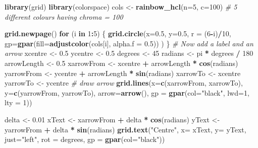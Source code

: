 \documentclass[9pt,letter]{article}
\newenvironment{Shaded}{\begin{snugshade}}{\end{snugshade}}
\newcommand{\KeywordTok}[1]{\textcolor[rgb]{0.13,0.29,0.53}{\textbf{#1}}}
\newcommand{\DataTypeTok}[1]{\textcolor[rgb]{0.13,0.29,0.53}{#1}}
\newcommand{\DecValTok}[1]{\textcolor[rgb]{0.00,0.00,0.81}{#1}}
\newcommand{\FloatTok}[1]{\textcolor[rgb]{0.00,0.00,0.81}{#1}}
\newcommand{\StringTok}[1]{\textcolor[rgb]{0.31,0.60,0.02}{#1}}
\newcommand{\CommentTok}[1]{\textcolor[rgb]{0.56,0.35,0.01}{\textit{#1}}}
\newcommand{\ControlFlowTok}[1]{\textcolor[rgb]{0.13,0.29,0.53}{\textbf{#1}}}
\newcommand{\OperatorTok}[1]{\textcolor[rgb]{0.81,0.36,0.00}{\textbf{#1}}}
\newcommand{\NormalTok}[1]{#1}
\begin{document}
\begin{Shaded}
\begin{Highlighting}[]
\KeywordTok{library}\NormalTok{(grid)}
\KeywordTok{library}\NormalTok{(colorspace)}
\NormalTok{cols <-}\StringTok{ }\KeywordTok{rainbow_hcl}\NormalTok{(}\DataTypeTok{n=}\DecValTok{5}\NormalTok{, }\DataTypeTok{c=}\DecValTok{100}\NormalTok{)  }\CommentTok{# 5 different colours having chroma = 100}

\KeywordTok{grid.newpage}\NormalTok{()}
\ControlFlowTok{for}\NormalTok{ (i }\ControlFlowTok{in} \DecValTok{1}\OperatorTok{:}\DecValTok{5}\NormalTok{) \{}
  \KeywordTok{grid.circle}\NormalTok{(}\DataTypeTok{x=}\FloatTok{0.5}\NormalTok{,}
              \DataTypeTok{y=}\FloatTok{0.5}\NormalTok{,}
              \DataTypeTok{r =}\NormalTok{ (}\DecValTok{6}\OperatorTok{-}\NormalTok{i)}\OperatorTok{/}\DecValTok{10}\NormalTok{,}
              \DataTypeTok{gp=}\KeywordTok{gpar}\NormalTok{(}\DataTypeTok{fill=}\KeywordTok{adjustcolor}\NormalTok{(cols[i], }\DataTypeTok{alpha.f =} \FloatTok{0.5}\NormalTok{))}
\NormalTok{  )}
\NormalTok{\}}
\CommentTok{# Now add a label and an arrow}
\NormalTok{xcentre <-}\StringTok{ }\FloatTok{0.5}
\NormalTok{ycentre <-}\StringTok{ }\FloatTok{0.5}
\NormalTok{degrees <-}\StringTok{ }\DecValTok{45}
\NormalTok{radians <-}\StringTok{ }\NormalTok{pi }\OperatorTok{*}\StringTok{ }\NormalTok{degrees }\OperatorTok{/}\StringTok{ }\DecValTok{180}
\NormalTok{arrowLength <-}\StringTok{ }\FloatTok{0.5} 
\NormalTok{xarrowFrom <-}\StringTok{ }\NormalTok{xcentre }\OperatorTok{+}\StringTok{ }\NormalTok{arrowLength }\OperatorTok{*}\StringTok{ }\KeywordTok{cos}\NormalTok{(radians)}
\NormalTok{yarrowFrom <-}\StringTok{ }\NormalTok{ycentre }\OperatorTok{+}\StringTok{ }\NormalTok{arrowLength }\OperatorTok{*}\StringTok{ }\KeywordTok{sin}\NormalTok{(radians)}
\NormalTok{xarrowTo <-}\StringTok{ }\NormalTok{xcentre }
\NormalTok{yarrowTo <-}\StringTok{ }\NormalTok{ycentre}
\CommentTok{# draw arrow}
\KeywordTok{grid.lines}\NormalTok{(}\DataTypeTok{x=}\KeywordTok{c}\NormalTok{(xarrowFrom, xarrowTo), }\DataTypeTok{y=}\KeywordTok{c}\NormalTok{(yarrowFrom, yarrowTo), }
           \DataTypeTok{arrow=}\KeywordTok{arrow}\NormalTok{(),}
           \DataTypeTok{gp =} \KeywordTok{gpar}\NormalTok{(}\DataTypeTok{col=}\StringTok{"black"}\NormalTok{, }\DataTypeTok{lwd=}\DecValTok{1}\NormalTok{, }\DataTypeTok{lty =} \DecValTok{1}\NormalTok{))}

\NormalTok{delta <-}\StringTok{ }\FloatTok{0.01}
\NormalTok{xText <-}\StringTok{ }\NormalTok{xarrowFrom }\OperatorTok{+}\StringTok{ }\NormalTok{delta }\OperatorTok{*}\StringTok{ }\KeywordTok{cos}\NormalTok{(radians)}
\NormalTok{yText <-}\StringTok{ }\NormalTok{yarrowFrom }\OperatorTok{+}\StringTok{ }\NormalTok{delta }\OperatorTok{*}\StringTok{ }\KeywordTok{sin}\NormalTok{(radians)}
\KeywordTok{grid.text}\NormalTok{(}\StringTok{"Centre"}\NormalTok{, }\DataTypeTok{x=}\NormalTok{ xText, }\DataTypeTok{y=}\NormalTok{ yText,}
          \DataTypeTok{just=}\StringTok{"left"}\NormalTok{, }\DataTypeTok{rot =}\NormalTok{ degrees,}
          \DataTypeTok{gp =} \KeywordTok{gpar}\NormalTok{(}\DataTypeTok{col=}\StringTok{"black"}\NormalTok{))}
\end{Highlighting}
\end{Shaded}
\end{document}
